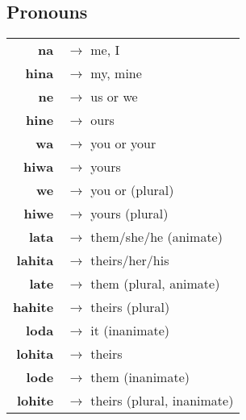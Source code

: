\casestable

\subsection*{Pronouns}
\begin{tabular}{rl}
\textbf{na} & $\rightarrow$ me, I \\
\textbf{hina} & $\rightarrow$ my, mine \\
\textbf{ne} & $\rightarrow$ us or we \\
\textbf{hine} & $\rightarrow$ ours \\
\textbf{wa} & $\rightarrow$ you or your \\
\textbf{hiwa} & $\rightarrow$ yours \\
\textbf{we} & $\rightarrow$ you or (plural) \\
\textbf{hiwe} & $\rightarrow$ yours (plural) \\
\textbf{lata} & $\rightarrow$ them/she/he (animate)\\
\textbf{lahita} & $\rightarrow$ theirs/her/his \\
\textbf{late} & $\rightarrow$ them (plural, animate) \\
\textbf{hahite} & $\rightarrow$ theirs (plural) \\

\textbf{loda} & $\rightarrow$ it (inanimate)\\
\textbf{lohita} & $\rightarrow$ theirs \\
\textbf{lode} & $\rightarrow$ them (inanimate) \\
\textbf{lohite} & $\rightarrow$ theirs (plural, inanimate) \\

\end{tabular}

